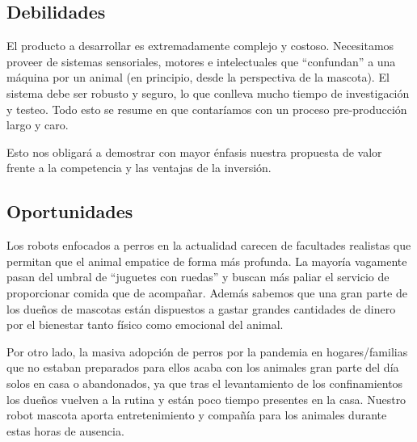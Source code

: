 \subsection{Debilidades}

El producto a desarrollar es extremadamente complejo y costoso. Necesitamos proveer de sistemas sensoriales, motores e intelectuales que ``confundan'' a una máquina por un animal (en principio, desde la perspectiva de la mascota). El sistema debe ser robusto y seguro, lo que conlleva mucho tiempo de investigación y testeo.
Todo esto se resume en que contaríamos con un proceso pre-producción largo y caro.

\vspace{\baselineskip}

Esto nos obligará a demostrar con mayor énfasis nuestra propuesta de valor frente a la competencia y las ventajas de la inversión.

\subsection{Oportunidades}

Los robots enfocados a perros en la actualidad carecen de facultades realistas que permitan que el animal empatice de forma más profunda. La mayoría vagamente pasan del umbral de ``juguetes con ruedas'' y buscan más paliar el servicio de proporcionar comida que de acompañar. Además sabemos que una gran parte de los dueños de mascotas están dispuestos a gastar grandes cantidades de dinero por el bienestar tanto físico como emocional del animal.

\vspace{\baselineskip}

Por otro lado, la masiva adopción de perros por la pandemia en hogares/familias que no estaban preparados para ellos acaba con los animales gran parte del día solos en casa o abandonados, ya que tras el levantamiento de los confinamientos los dueños vuelven a la rutina y están poco tiempo presentes en la casa. Nuestro robot mascota aporta entretenimiento y compañía para los animales durante estas horas de ausencia.

